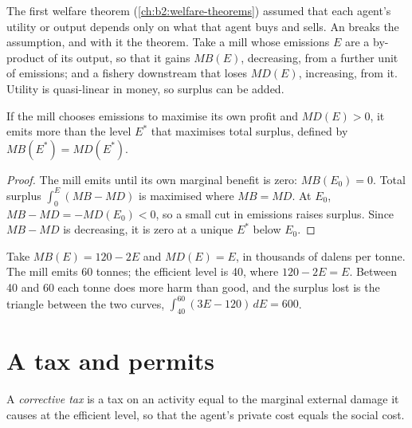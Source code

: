 The first welfare theorem (\cref{ch:b2:welfare-theorems}) assumed that each agent's utility or output depends only on
what that agent buys and sells. An  breaks the assumption, and with it the theorem. Take a mill whose
emissions $E$ are a by-product of its output, so that it gains $\mathit{MB}(E)$, decreasing, from a further unit of emissions; and a
fishery downstream that loses $\mathit{MD}(E)$, increasing, from it. Utility is quasi-linear in money, so surplus can be added.

\begin{proposition}\label{prop:b2:externalities-and-public-goods-theory:inefficient}
If the mill chooses emissions to maximise its own profit and $\mathit{MD}(E) > 0$, it emits more than the level $E^*$ that maximises total
surplus, defined by $\mathit{MB}(E^*) = \mathit{MD}(E^*)$.
\end{proposition}

\begin{proof}
The mill emits until its own marginal benefit is zero: $\mathit{MB}(E_0) = 0$. Total surplus $\int_0^E (\mathit{MB} - \mathit{MD})$ is maximised where $\mathit{MB} = \mathit{MD}$. At $E_0$,
$\mathit{MB} - \mathit{MD} = -\mathit{MD}(E_0) < 0$, so a small cut in emissions raises surplus. Since $\mathit{MB} - \mathit{MD}$ is decreasing, it is zero at a unique $E^*$ below
$E_0$.
\end{proof}

Take $\mathit{MB}(E) = 120 - 2E$ and $\mathit{MD}(E) = E$, in thousands of dalens per tonne. The mill emits 60 tonnes; the efficient level is 40, where $120 -
2E = E$. Between 40 and 60 each tonne does more harm than good, and the surplus lost is the triangle between the two curves, $\int_{40}^{60}(3E - 120)\,dE = 600$.

\section{A tax and permits}\label{sec:b2:externalities-and-public-goods-theory:tax}

\begin{definition}\label{def:b2:externalities-and-public-goods-theory:corrective-tax}
A \emph{corrective tax} is a tax on an activity equal to the marginal external damage it causes at the
efficient level, so that the agent's private cost equals the social cost.
\end{definition}

